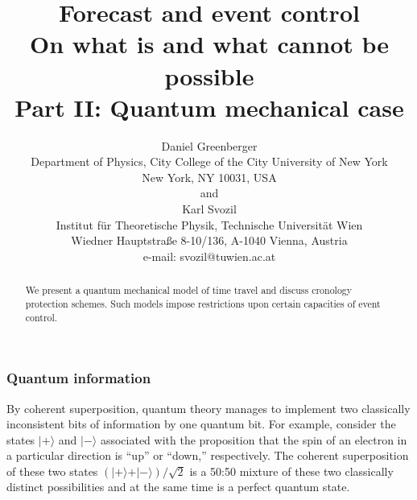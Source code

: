 \renewcommand{\baselinestretch}{1.2}
\RequirePackage{times}
\RequirePackage{mathptm}


\def\frak{\cal }
\def\Bbb{\bf }

\title{Forecast and event control\\On what is and what cannot be possible\\
Part II: Quantum mechanical case}
\author{Daniel Greenberger \\
 {\small Department of Physics,}
  {\small City College of the City University of New York}     \\
  {\small New York, NY 10031,}
  {\small USA   }            \\
{\small and}\\
Karl Svozil\\
 {\small Institut f\"ur Theoretische Physik,}
  {\small Technische Universit\"at Wien }     \\
  {\small Wiedner Hauptstra\ss e 8-10/136,}
  {\small A-1040 Vienna, Austria   }            \\
  {\small e-mail: svozil@tuwien.ac.at}}
\date{ }
\maketitle


\begin{abstract}
We present a quantum mechanical model of time travel and
discuss cronology protection schemes.
Such models impose restrictions upon certain capacities
of event control.
\end{abstract}


\subsubsection*{Quantum information}

By coherent superposition,
quantum theory manages to implement two classically inconsistent
bits of information by one quantum bit.
For example, consider the states $\vert +\rangle$ and $\vert -\rangle$
associated with the proposition that the spin of an electron
in a particular direction is ``up'' or ``down,'' respectively.
The coherent superposition  of these two states
$(\vert +\rangle + \vert -\rangle )/\sqrt{2}$
is a 50:50 mixture of these two classically distinct possibilities and at
the same time is a perfect quantum state.

